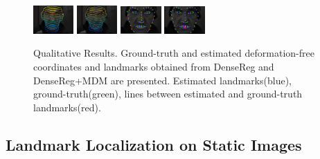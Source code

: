 \begin{figure}[ht]
\includegraphics[width=0.13775\textwidth]{resources/Human_Poses/results/7/VGT}
\includegraphics[width=0.13775\textwidth]{resources/Human_Poses/results/7/Vreg}
\includegraphics[width=0.13775\textwidth]{resources/Human_Poses/results/7/Landmarks_alp}
\includegraphics[width=0.13775\textwidth]{resources/Human_Poses/results/7/Landmarks_MDM}



\caption{Qualitative Results. Ground-truth and estimated deformation-free coordinates and  landmarks obtained from DenseReg and DenseReg+MDM are presented. Estimated landmarks(blue), ground-truth(green), lines between estimated and ground-truth landmarks(red).}
\label{fig:qualitative_densereg}

\end{figure}

\subsection{Landmark Localization on Static Images}
\label{sec:exp_landmark_localization}

